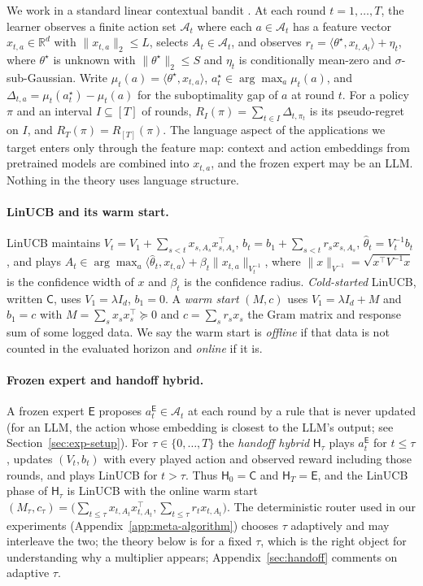 \documentclass{article}
\theoremstyle{definition}
\theoremstyle{remark}
\theoremstyle{remark}
\newcommand{\Cold}{\mathsf{C}}
\newcommand{\Exp}{\mathsf{E}}
\newcommand{\Hyb}{\mathsf{H}}
\begin{document}
We work in a standard linear contextual bandit
\cite{abbasi2011improved,chu2011contextual,lattimore2020bandit}. At each round
$t=1,\dots,T$, the learner observes a finite action set $\mathcal A_t$ where
each $a\in\mathcal A_t$ has a feature vector $x_{t,a}\in\mathbb R^d$ with
$\|x_{t,a}\|_2\le L$, selects $A_t\in\mathcal A_t$, and observes
$r_t=\langle\theta^\star,x_{t,A_t}\rangle+\eta_t$, where $\theta^\star$ is
unknown with $\|\theta^\star\|_2\le S$ and $\eta_t$ is conditionally mean-zero
and $\sigma$-sub-Gaussian. Write $\mu_t(a)=\langle\theta^\star,x_{t,a}\rangle$,
$a_t^\star\in\arg\max_a\mu_t(a)$, and $\Delta_{t,a}=\mu_t(a_t^\star)-\mu_t(a)$
for the suboptimality gap of $a$ at round $t$. For a policy $\pi$ and an
interval $I\subseteq[T]$ of rounds, $R_I(\pi)=\sum_{t\in I}\Delta_{t,\pi_t}$ is
its pseudo-regret on $I$, and $R_T(\pi)=R_{[T]}(\pi)$. The language aspect of
the applications we target enters only through the feature map: context and
action embeddings from pretrained models are combined into $x_{t,a}$, and the
frozen expert may be an LLM. Nothing in the theory uses language structure.

\paragraph{LinUCB and its warm start.}
LinUCB maintains $V_t=V_1+\sum_{s<t}x_{s,A_s}x_{s,A_s}^\top$,
$b_t=b_1+\sum_{s<t}r_sx_{s,A_s}$, $\widehat\theta_t=V_t^{-1}b_t$, and plays
$A_t\in\arg\max_a\langle\widehat\theta_t,x_{t,a}\rangle+\beta_t\|x_{t,a}\|_{V_t^{-1}}$,
where $\|x\|_{V^{-1}}=\sqrt{x^\top V^{-1}x}$ is the confidence width of $x$ and
$\beta_t$ is the confidence radius. \emph{Cold-started} LinUCB, written
$\Cold$, uses $V_1=\lambda I_d$, $b_1=0$. A \emph{warm start} $(M,c)$ uses
$V_1=\lambda I_d+M$ and $b_1=c$ with $M=\sum_sx_sx_s^\top\succeq0$ and
$c=\sum_sr_sx_s$ the Gram matrix and response sum of some logged data. We say
the warm start is \emph{offline} if that data is not counted in the evaluated
horizon and \emph{online} if it is.

\paragraph{Frozen expert and handoff hybrid.}
A frozen expert $\Exp$ proposes $a_t^{\Exp}\in\mathcal A_t$ at each round by a
rule that is never updated (for an LLM, the action whose embedding is closest
to the LLM's output; see Section~\ref{sec:exp-setup}). For $\tau\in\{0,\dots,T\}$
the \emph{handoff hybrid} $\Hyb_\tau$ plays $a_t^{\Exp}$ for $t\le\tau$, updates
$(V_t,b_t)$ with every played action and observed reward including those
rounds, and plays LinUCB for $t>\tau$. Thus $\Hyb_0=\Cold$ and $\Hyb_T=\Exp$,
and the LinUCB phase of $\Hyb_\tau$ is LinUCB with the online warm start
$(M_\tau,c_\tau)=\bigl(\sum_{t\le\tau}x_{t,A_t}x_{t,A_t}^\top,\sum_{t\le\tau}r_tx_{t,A_t}\bigr)$.
The deterministic router used in our experiments
(Appendix~\ref{app:meta-algorithm}) chooses $\tau$ adaptively and may
interleave the two; the theory below is for a fixed $\tau$, which is the
right object for understanding why a multiplier appears; Appendix~\ref{sec:handoff}
comments on adaptive $\tau$.
\end{document}
